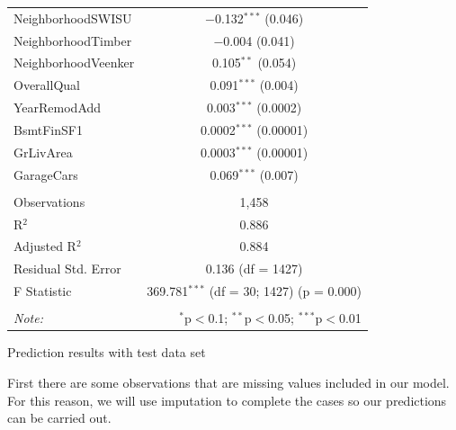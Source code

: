 \documentclass[]{article}
\begin{document}
\begin{table}[!htbp]
\begin{tabular}{@{\extracolsep{5pt}}lc}
  NeighborhoodSWISU & $-$0.132$^{***}$ (0.046) \\ 
  NeighborhoodTimber & $-$0.004 (0.041) \\ 
  NeighborhoodVeenker & 0.105$^{**}$ (0.054) \\ 
  OverallQual & 0.091$^{***}$ (0.004) \\ 
  YearRemodAdd & 0.003$^{***}$ (0.0002) \\ 
  BsmtFinSF1 & 0.0002$^{***}$ (0.00001) \\ 
  GrLivArea & 0.0003$^{***}$ (0.00001) \\ 
  GarageCars & 0.069$^{***}$ (0.007) \\ 
 \hline \\[-1.8ex] 
Observations & 1,458 \\ 
R$^{2}$ & 0.886 \\ 
Adjusted R$^{2}$ & 0.884 \\ 
Residual Std. Error & 0.136 (df = 1427) \\ 
F Statistic & 369.781$^{***}$ (df = 30; 1427)  (p = 0.000) \\ 
\hline 
\hline \\[-1.8ex] 
\textit{Note:}  & \multicolumn{1}{r}{$^{*}$p$<$0.1; $^{**}$p$<$0.05; $^{***}$p$<$0.01} \\ 
\end{tabular} 
\end{table}

Prediction results with test data set

First there are some observations that are missing values included in
our model. For this reason, we will use imputation to complete the cases
so our predictions can be carried out.
\end{document}
